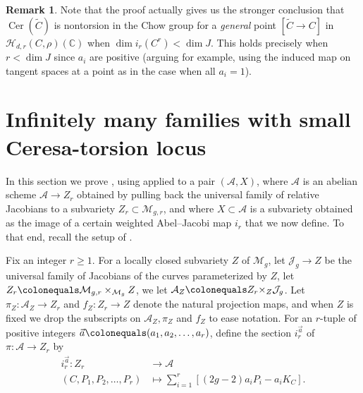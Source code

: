 \documentclass[reqno,10pt]{amsart}
\theoremstyle{definition}
\theoremstyle{definition}
\newtheorem{rem}[thm]{Remark}
\def\C{{\mathbb C}}
\def\C{{\mathbb C}}
\newcommand{\Cer}{\operatorname{Cer}}
\begin{document}
\begin{rem}
Note that the proof actually gives us the stronger conclusion that $\Cer(\widetilde{C})$ is nontorsion in the Chow group for a {\textit{general}} point $[\widetilde{C} \rightarrow C]$ in $ \mathcal{H}_{d,r}(C,\rho)(\C)$ when $\dim i_r(C^r) < \dim J$. This holds precisely when $r < \dim J$ since $a_i$ are positive (arguing for example, using the induced map on tangent spaces at a point as in the case when all $a_i=1$).
\end{rem}

\section{Infinitely many families with small Ceresa-torsion locus} 
In this section we prove , using  applied to a pair $(\mathcal{A},X)$, where $\mathcal{A}$ is an abelian scheme $\mathcal{A} \rightarrow Z_r$ obtained by pulling back the universal family of relative Jacobians to a subvariety $Z_r \subset \mathcal{M}_{g,r}$, and where $X \subset \mathcal{A}$ is a subvariety obtained as the image of a certain weighted Abel--Jacobi map $i_r$ that we now define. To that end, recall the setup of .

Fix an integer $r \geq 1$.  For a locally closed subvariety $Z$ of $\mathcal{M}_g$, let $\mathcal{J}_g \rightarrow Z$ be the universal family of Jacobians of the curves parameterized by $Z$,  let $Z_r \colonequals \mathcal{M}_{g,r} \times_{\mathcal{M}_g} Z$, we let $\mathcal{A}_Z \colonequals Z_r {\times_Z} \mathcal{J}_g$.  Let $\pi_{Z} \colon \mathcal{A}_Z \rightarrow Z_r$ and $f_Z \colon Z_r \rightarrow Z$ denote the natural projection maps, and when $Z$ is fixed we drop the subscripts on $\mathcal{A}_Z, \pi_Z$ and $f_Z$ to ease notation. For an $r$-tuple of positive integers $\vec{a} \colonequals (a_1,a_2,\ldots,a_r)$, define the section $i_r^{\vec{a}}$ of  $\pi \colon \mathcal{A} \rightarrow Z_r$ by
\begin{align*}
    i_r^{\vec{a}} \colon Z_r  &\rightarrow \mathcal{A} \\
    (C,P_1,P_2,\ldots,P_r) &\mapsto \sum_{i=1}^r \left[ (2g-2) a_i P_i - a_i K_C \right].
\end{align*}
\end{document}
